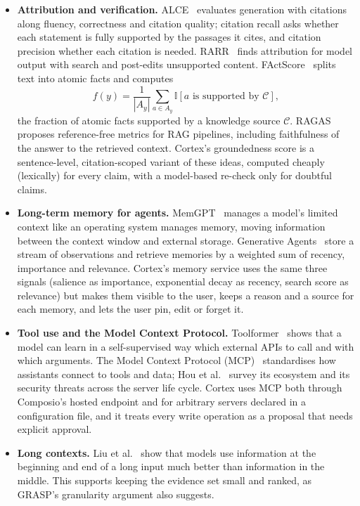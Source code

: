 \begin{itemize}
\item \textbf{Attribution and verification.} ALCE~\cite{gao2023alce} evaluates generation with citations along fluency, correctness and citation quality; citation recall asks whether each statement is fully supported by the passages it cites, and citation precision whether each citation is needed. RARR~\cite{gao2023rarr} finds attribution for model output with search and post-edits unsupported content. FActScore~\cite{min2023factscore} splits text into atomic facts and computes
\[ f(y) = \frac{1}{|A_y|} \sum_{a \in A_y} \mathbb{I}[a \mbox{ is supported by } \mathcal{C}], \]
the fraction of atomic facts supported by a knowledge source $\mathcal{C}$. RAGAS~\cite{es2024ragas} proposes reference-free metrics for RAG pipelines, including faithfulness of the answer to the retrieved context. Cortex's groundedness score is a sentence-level, citation-scoped variant of these ideas, computed cheaply (lexically) for every claim, with a model-based re-check only for doubtful claims.

\item \textbf{Long-term memory for agents.} MemGPT~\cite{packer2023memgpt} manages a model's limited context like an operating system manages memory, moving information between the context window and external storage. Generative Agents~\cite{park2023generative} store a stream of observations and retrieve memories by a weighted sum of recency, importance and relevance. Cortex's memory service uses the same three signals (salience as importance, exponential decay as recency, search score as relevance) but makes them visible to the user, keeps a reason and a source for each memory, and lets the user pin, edit or forget it.

\item \textbf{Tool use and the Model Context Protocol.} Toolformer~\cite{schick2023toolformer} shows that a model can learn in a self-supervised way which external APIs to call and with which arguments. The Model Context Protocol (MCP)~\cite{anthropic2024mcp} standardises how assistants connect to tools and data; Hou et al.~\cite{hou2025mcp} survey its ecosystem and its security threats across the server life cycle. Cortex uses MCP both through Composio's hosted endpoint and for arbitrary servers declared in a configuration file, and it treats every write operation as a proposal that needs explicit approval.

\item \textbf{Long contexts.} Liu et al.~\cite{liu2024lost} show that models use information at the beginning and end of a long input much better than information in the middle. This supports keeping the evidence set small and ranked, as GRASP's granularity argument also suggests.
\end{itemize}

